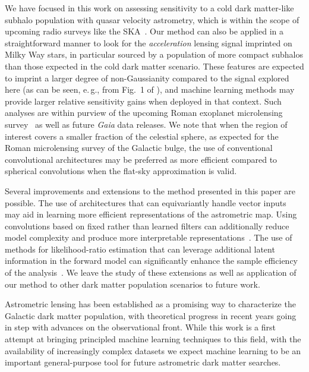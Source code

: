 \documentclass[twocolumn]{aastex631}
\newcommand{\eg}{{e.\,g.}\xspace}
\begin{document}
We have focused in this work on assessing sensitivity to a cold dark matter-like subhalo population with quasar velocity astrometry, which is within the scope of upcoming radio surveys like the SKA~\citep{Fomalont:2004hr,Jarvis:2015tqa}. Our method can also be applied in a straightforward manner to look for the \emph{acceleration} lensing signal imprinted on Milky Way stars, in particular sourced by a population of more compact subhalos than those expected in the cold dark matter scenario. These features are expected to imprint a larger degree of non-Gaussianity compared to the signal explored here (as can be seen, \eg, from Fig.~1 of \citet{Mishra-Sharma:2020ynk}), and machine learning methods may provide larger relative sensitivity gains when deployed in that context. Such analyses are within purview of the upcoming Roman exoplanet microlensing survey~\citep{Pardo:2021uzy} as well as future \emph{Gaia} data releases. {We note that when the region of interest covers a smaller fraction of the celestial sphere, as expected for the Roman microlensing survey of the Galactic bulge, the use of conventional convolutional architectures may be preferred as more efficient compared to spherical convolutions when the flat-sky approximation is valid.}

Several improvements and extensions to the method presented in this paper are possible. The use of architectures that can equivariantly handle vector inputs~\citep{DBLP:conf/nips/EstevesMD20} {may} aid in learning more efficient representations of the astrometric map. Using convolutions based on fixed rather than learned filters can additionally reduce model complexity and produce more interpretable representations~\citep{Cheng:2020qbx,2021arXiv210709145H,2021arXiv210411244S,2021arXiv210202828M,Valogiannis:2021chp}. The use of methods for likelihood-ratio estimation that can leverage additional latent information in the forward model can significantly enhance the sample efficiency of the analysis~\citep{Brehmer:2018eca,Brehmer:2018hga,Brehmer:2018kdj,Stoye:2018ovl}. We leave the study of these extensions as well as application of our method to other dark matter population scenarios to future work.

Astrometric lensing has been established as a promising way to characterize the Galactic dark matter population, with theoretical progress in recent years going in step with advances on the observational front. While this work is a first attempt at bringing principled machine learning techniques to this field, with the availability of increasingly complex datasets we expect machine learning to be an important general-purpose tool for future astrometric dark matter searches.
\end{document}
